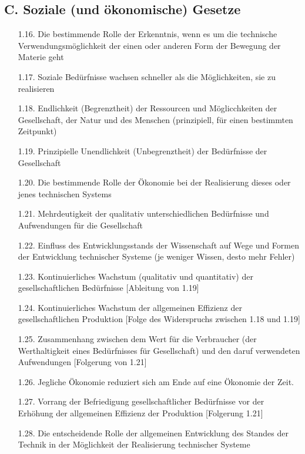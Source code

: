 \documentclass[11pt,a4paper]{article}
\begin{document}
\subsection*{C. Soziale (und ökonomische) Gesetze}
\begin{itemize}\itemsep0pt
\item[1.16.] Die bestimmende Rolle der Erkenntnis, wenn es um die technische
  Verwendungsmöglichkeit der einen oder anderen Form der Bewegung der Materie
  geht
\item[1.17.] Soziale Bedürfnisse wachsen schneller als die Möglichkeiten, sie
  zu realisieren
\item[1.18.] Endlichkeit (Begrenztheit) der Ressourcen und Möglicchkeiten der
  Gesellschaft, der Natur und des Menschen (prinzipiell, für einen bestimmten
  Zeitpunkt)
\item[1.19.] Prinzipielle Unendlichkeit (Unbegrenztheit) der Bedürfnisse der
  Gesellschaft
\item[1.20.] Die bestimmende Rolle der Ökonomie bei der Realisierung dieses
  oder jenes technischen Systems
\item[1.21.] Mehrdeutigkeit der qualitativ unterschiedlichen Bedürfnisse und
  Aufwendungen für die Gesellschaft
\item[1.22.] Einfluss des Entwicklungsstands der Wissenschaft auf Wege und
  Formen der Entwicklung technischer Systeme (je weniger Wissen, desto mehr
  Fehler)
\item[1.23.] Kontinuierliches Wachstum (qualitativ und quantitativ) der
  gesellschaftlichen Bedürfnisse [Ableitung von 1.19]
\item[1.24.] Kontinuierliches Wachstum der allgemeinen Effizienz der
  gesellschaftlichen Produktion [Folge des Widerspruchs zwischen 1.18 und
    1.19]
\item[1.25.] Zusammenhang zwischen dem Wert für die Verbraucher (der
  Werthaltigkeit eines Bedürfnisses für Gesellschaft) und den daruf
  verwendeten Aufwendungen [Folgerung von 1.21]
\item[1.26.] Jegliche Ökonomie reduziert sich am Ende auf eine Ökonomie der
  Zeit.
\item[1.27.] Vorrang der Befriedigung gesellschaftlicher Bedürfnisse vor der
  Erhöhung der allgemeinen Effizienz der Produktion [Folgerung 1.21]
\item[1.28.] Die entscheidende Rolle der allgemeinen Entwicklung des Standes
  der Technik in der Möglichkeit der Realisierung technischer Systeme
\end{itemize}
\end{document}
